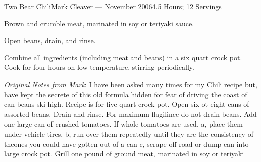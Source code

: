 \documentclass{article}
\begin{document}
\begin{recipe}{Two Bear Chili}{Mark Cleaver --- November 2006}{4.5 Hours; 12 Servings}

   Brown and crumble meat, marinated in soy or teriyaki sauce.

   Open beans, drain, and rinse.

   Combine all ingredients (including meat and beans) in a six quart crock pot.
   Cook for four hours on low temperature, stirring periodically.

   \freeform
   \emph{Original Notes from Mark}:
   \newline\newline
   I have been asked many times for my Chili recipe but, have kept the secrete
   of this old formula hidden for fear of driving the coast of can beans ski
   high.
   \newline\newline
   Recipe is for five quart crock pot.
   \newline\newline
   Open six ot eight cans of assorted beans.  Drain and rinse.  For maximum
   flagilince do not drain beans.
   \newline\newline
   Add one large can of crushed tomatoes.  If whole tomatoes are used,
   \newline\newline
   a, place them under vehicle tires,
   \newline\newline
   b, run over them repeatedly until they are the consistency of theones you
   could have gotten out of a can
   \newline\newline
   c, scrape off road or dump can into large crock pot.
   \newline\newline
   Grill one pound of ground meat, marinated in soy or teriyaki

\end{recipe}
\end{document}
